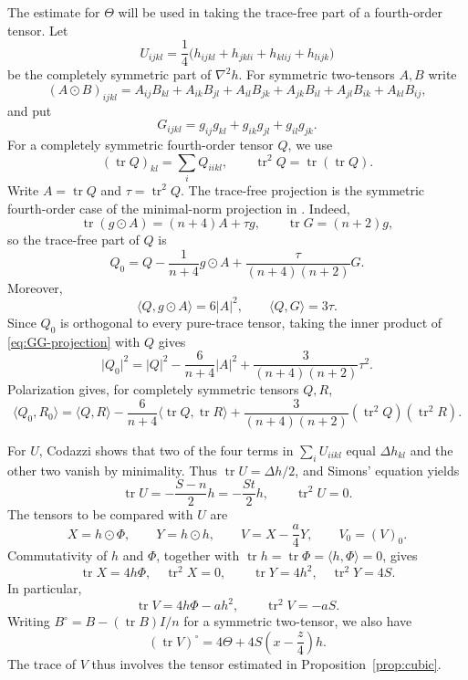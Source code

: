 \documentclass[11pt,reqno]{amsart}
\numberwithin{equation}{section}
\newcommand{\tr}{\operatorname{tr}}
\newcommand{\ip}[2]{\langle #1,#2\rangle}
\newcommand{\norm}[1]{\lvert #1\rvert}
\begin{document}
The estimate for $\Theta$ will be used in taking the trace-free part of a fourth-order tensor. Let
\[
U_{ijkl}=\frac14\bigl(h_{ijkl}+h_{jkli}+h_{klij}+h_{lijk}\bigr)
\]
be the completely symmetric part of $\nabla^2h$. For symmetric two-tensors $A,B$ write
\[
(A\odot B)_{ijkl}
=A_{ij}B_{kl}+A_{ik}B_{jl}+A_{il}B_{jk}
+A_{jk}B_{il}+A_{jl}B_{ik}+A_{kl}B_{ij},
\]
and put
\[
G_{ijkl}=g_{ij}g_{kl}+g_{ik}g_{jl}+g_{il}g_{jk}.
\]
For a completely symmetric fourth-order tensor $Q$, we use
\[
(\tr Q)_{kl}=\sum_iQ_{iikl},
\qquad
\tr^2Q=\tr(\tr Q).
\]
Write $A=\tr Q$ and $\tau=\tr^2Q$. The trace-free projection is the symmetric fourth-order case of the minimal-norm projection in \cite[Corollary~1.4]{GuoGuan}. Indeed,
\[
\tr(g\odot A)=(n+4)A+\tau g,
\qquad
\tr G=(n+2)g,
\]
so the trace-free part of $Q$ is
\begin{equation}\label{eq:GG-projection}
Q_0
=Q-\frac1{n+4}g\odot A
+\frac{\tau}{(n+4)(n+2)}G.
\end{equation}
Moreover,
\[
\ip{Q}{g\odot A}=6\norm A^2,
\qquad
\ip{Q}{G}=3\tau.
\]
Since $Q_0$ is orthogonal to every pure-trace tensor, taking the inner
product of \eqref{eq:GG-projection} with $Q$ gives
\begin{equation}\label{eq:GG-norm}
\norm{Q_0}^2
=\norm Q^2-\frac6{n+4}\norm A^2
+\frac{3}{(n+4)(n+2)}\tau^2.
\end{equation}
Polarization gives, for completely symmetric tensors $Q,R$,
\begin{equation}\label{eq:GG-polarization}
\ip{Q_0}{R_0}
=\ip QR-\frac6{n+4}\ip{\tr Q}{\tr R}
+\frac{3}{(n+4)(n+2)}(\tr^2Q)(\tr^2R).
\end{equation}

For $U$, Codazzi shows that two of the four terms in $\sum_i U_{iikl}$ equal
$\Delta h_{kl}$ and the other two vanish by minimality. Thus
$\tr U=\Delta h/2$, and Simons' equation yields
\begin{equation}\label{eq:fourth-traces}
\tr U=-\frac{S-n}{2}h=-\frac{St}{2}h,
\qquad
\tr^2U=0.
\end{equation}
The tensors to be compared with $U$ are
\[
X=h\odot\Phi,
\qquad
Y=h\odot h,
\qquad
V=X-\frac a4Y,
\qquad
V_0=(V)_0.
\]
Commutativity of $h$ and $\Phi$, together with $\tr h=\tr\Phi=\ip h\Phi=0$, gives
\[
\tr X=4h\Phi,
\quad \tr^2X=0,
\qquad
\tr Y=4h^2,
\quad \tr^2Y=4S.
\]
In particular,
\begin{equation}\label{eq:V-traces}
\tr V=4h\Phi-ah^2,
\qquad
\tr^2V=-aS.
\end{equation}
Writing $B^\circ=B-(\tr B)I/n$ for a symmetric two-tensor, we also have
\[
(\tr V)^\circ=4\Theta+4S\left(x-\frac z4\right)h.
\]
The trace of $V$ thus involves the tensor estimated in Proposition~\ref{prop:cubic}.
\end{document}
